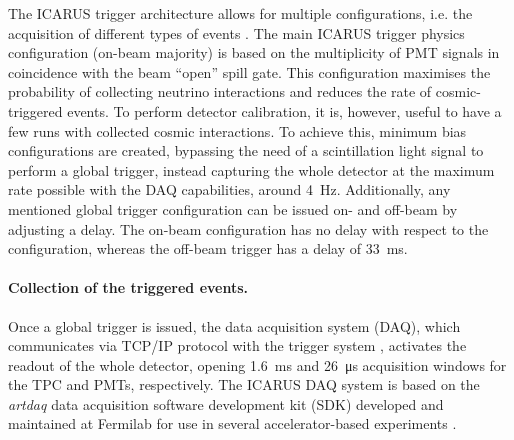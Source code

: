The ICARUS trigger architecture allows for multiple configurations, i.e. the acquisition of different types of events \cite{ICARUS:2025kai}. The main ICARUS trigger physics configuration (on-beam majority) is based on the multiplicity of PMT signals in coincidence with the beam ``open'' spill gate. This configuration maximises the probability of collecting neutrino interactions and reduces the rate of cosmic-triggered events. To perform detector calibration, it is, however, useful to have a few runs with collected cosmic interactions. To achieve this, minimum bias configurations are created, bypassing the need of a scintillation light signal to perform a global trigger, instead capturing the whole detector at the maximum rate possible with the DAQ capabilities, around \SI{4}{\hertz}. Additionally, any mentioned global trigger configuration can be issued on- and off-beam by adjusting a delay. The on-beam configuration has no delay with respect to the configuration, whereas the off-beam trigger has a delay of \SI{+33}{\ms}. 

\paragraph{Collection of the triggered events. } Once a global trigger is issued, the data acquisition system (DAQ), which communicates via TCP/IP protocol with the trigger system \cite{ICARUS:2025kai}, activates the readout of the whole detector, opening \SI{1.6}{\ms} and \SI{26}{\us} acquisition windows for the TPC and PMTs, respectively. The ICARUS DAQ system is based on the \emph{artdaq} data acquisition software development kit (SDK) developed and maintained at Fermilab for use in several accelerator-based experiments \cite{Biery:2013cda}.  


